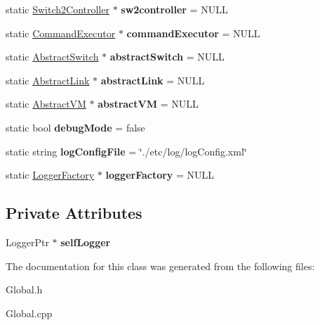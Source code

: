 \begin{DoxyCompactItemize}
\item 
\hypertarget{classGlobal_a16985c333b4866c538b00b5448f3df84}{static \hyperlink{classSwitch2Controller}{\-Switch2\-Controller} $\ast$ {\bfseries sw2controller} = \-N\-U\-L\-L}\label{classGlobal_a16985c333b4866c538b00b5448f3df84}

\item 
\hypertarget{classGlobal_ad04fbb00071e7613782f5e6d5fbc1ff7}{static \hyperlink{classCommandExecutor}{\-Command\-Executor} $\ast$ {\bfseries command\-Executor} = \-N\-U\-L\-L}\label{classGlobal_ad04fbb00071e7613782f5e6d5fbc1ff7}

\item 
\hypertarget{classGlobal_ad257cb80ec30114587e5458d60627f01}{static \hyperlink{classAbstractSwitch}{\-Abstract\-Switch} $\ast$ {\bfseries abstract\-Switch} = \-N\-U\-L\-L}\label{classGlobal_ad257cb80ec30114587e5458d60627f01}

\item 
\hypertarget{classGlobal_a4ba785783d3ef441585eebf41095addc}{static \hyperlink{classAbstractLink}{\-Abstract\-Link} $\ast$ {\bfseries abstract\-Link} = \-N\-U\-L\-L}\label{classGlobal_a4ba785783d3ef441585eebf41095addc}

\item 
\hypertarget{classGlobal_a8db0395299c5c5290a0f4bb4ca1c2e15}{static \hyperlink{classAbstractVM}{\-Abstract\-V\-M} $\ast$ {\bfseries abstract\-V\-M} = \-N\-U\-L\-L}\label{classGlobal_a8db0395299c5c5290a0f4bb4ca1c2e15}

\item 
\hypertarget{classGlobal_a971357f42e59ab1ffc8a9d25dc1222e6}{static bool {\bfseries debug\-Mode} = false}\label{classGlobal_a971357f42e59ab1ffc8a9d25dc1222e6}

\item 
\hypertarget{classGlobal_a9088f169ae7422e04f3ca682d95b5c1b}{static string {\bfseries log\-Config\-File} = \char`\"{}./etc/log/log\-Config.\-xml\char`\"{}}\label{classGlobal_a9088f169ae7422e04f3ca682d95b5c1b}

\item 
\hypertarget{classGlobal_a087d3f2d1c05451b121dd7b3d41e9afc}{static \hyperlink{classLoggerFactory}{\-Logger\-Factory} $\ast$ {\bfseries logger\-Factory} = \-N\-U\-L\-L}\label{classGlobal_a087d3f2d1c05451b121dd7b3d41e9afc}

\end{DoxyCompactItemize}
\subsection*{\-Private \-Attributes}
\begin{DoxyCompactItemize}
\item 
\hypertarget{classGlobal_a650bb163020c532901740bd122c4eaa4}{\-Logger\-Ptr $\ast$ {\bfseries self\-Logger}}\label{classGlobal_a650bb163020c532901740bd122c4eaa4}

\end{DoxyCompactItemize}


\-The documentation for this class was generated from the following files\-:\begin{DoxyCompactItemize}
\item 
\-Global.\-h\item 
\-Global.\-cpp\end{DoxyCompactItemize}
